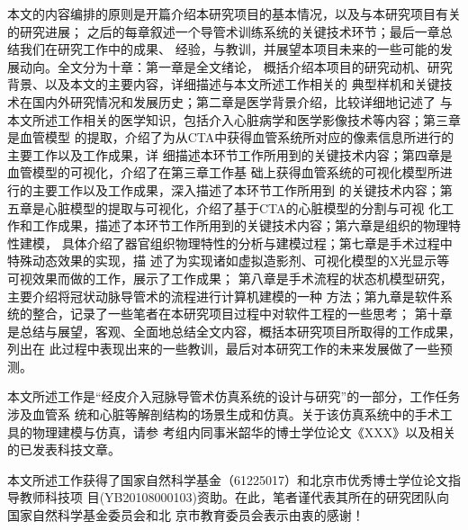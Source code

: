 本文的内容编排的原则是开篇介绍本研究项目的基本情况，以及与本研究项目有关的研究进展；
之后的每章叙述一个导管术训练系统的关键技术环节；最后一章总结我们在研究工作中的成果、
经验，与教训，并展望本项目未来的一些可能的发展动向。全文分为十章：第一章是全文绪论，
概括介绍本项目的研究动机、研究背景、以及本文的主要内容，详细描述与本文所述工作相关的
典型样机和关键技术在国内外研究情况和发展历史；第二章是医学背景介绍，比较详细地记述了
与本文所述工作相关的医学知识，包括介入心脏病学和医学影像技术等内容；第三章是血管模型
的提取，介绍了为从CTA中获得血管系统所对应的像素信息所进行的主要工作以及工作成果，详
细描述本环节工作所用到的关键技术内容；第四章是血管模型的可视化，介绍了在第三章工作基
础上获得血管系统的可视化模型所进行的主要工作以及工作成果，深入描述了本环节工作所用到
的关键技术内容；第五章是心脏模型的提取与可视化，介绍了基于CTA的心脏模型的分割与可视
化工作和工作成果，描述了本环节工作所用到的关键技术内容；第六章是组织的物理特性建模，
具体介绍了器官组织物理特性的分析与建模过程；第七章是手术过程中特殊动态效果的实现，描
述了为实现诸如虚拟造影剂、可视化模型的X光显示等可视效果而做的工作，展示了工作成果；
第八章是手术流程的状态机模型研究，主要介绍将冠状动脉导管术的流程进行计算机建模的一种
方法；第九章是软件系统的整合，记录了一些笔者在本研究项目过程中对软件工程的一些思考；
第十章是总结与展望，客观、全面地总结全文内容，概括本研究项目所取得的工作成果，列出在
此过程中表现出来的一些教训，最后对本研究工作的未来发展做了一些预测。

本文所述工作是“经皮介入冠脉导管术仿真系统的设计与研究”的一部分，工作任务涉及血管系
统和心脏等解剖结构的场景生成和仿真。关于该仿真系统中的手术工具的物理建模与仿真，请参
考组内同事米韶华的博士学位论文《XXX》以及相关的已发表科技文章。

本文所述工作获得了国家自然科学基金（61225017）和北京市优秀博士学位论文指导教师科技项
目(YB20108000103)资助。在此，笔者谨代表其所在的研究团队向国家自然科学基金委员会和北
京市教育委员会表示由衷的感谢！ 